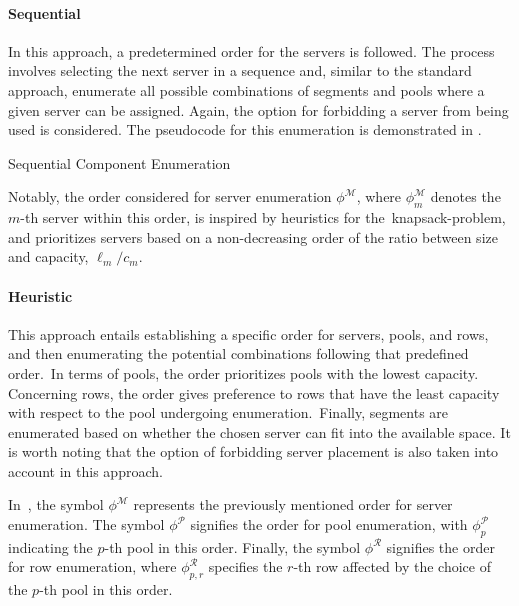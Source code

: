 \paragraph*{Sequential}

In this approach, a predetermined order for the servers is followed. The process
involves selecting the next server in a sequence and, similar to the standard
approach, enumerate all possible combinations of segments and pools where a
given server can be assigned. Again, the option for forbidding a server from
being used is considered. The pseudocode for this enumeration is demonstrated in
.

\begin{algorithm}[h]
  
  \caption{Sequential Component Enumeration}
  \label{algorithm:odc-enum-sequential}
\end{algorithm}

Notably, the order considered for server enumeration $\phi^\mathcal{M}$, where
$\phi_m^\mathcal{M}$ denotes the $m$-th server within this order, is inspired by
heuristics for the~\acrshort{knapsack-problem}, and prioritizes servers based on
a non-decreasing order of the ratio between size and capacity, $\ell_{m}/c_{m}$.

\paragraph*{Heuristic}

This approach entails establishing a specific order for servers, pools, and
rows, and then enumerating the potential combinations following that predefined
order.~In terms of pools, the order prioritizes pools with the lowest capacity.
Concerning rows, the order gives preference to rows that have the least capacity
with respect to the pool undergoing enumeration.~Finally, segments are
enumerated based on whether the chosen server can fit into the available space.
It is worth noting that the option of forbidding server placement is also taken
into account in this approach.


In~, the symbol $\phi^{\mathcal{M}}$
represents the previously mentioned order for server enumeration. The symbol
$\phi^\mathcal{P}$ signifies the order for pool enumeration, with
$\phi_{p}^\mathcal{P}$ indicating the $p$-th pool in this order. Finally, the
symbol $\phi^\mathcal{R}$ signifies the order for row enumeration, where
$\phi_{p, r}^\mathcal{R}$ specifies the $r$-th row affected by the choice of the
$p$-th pool in this order.



